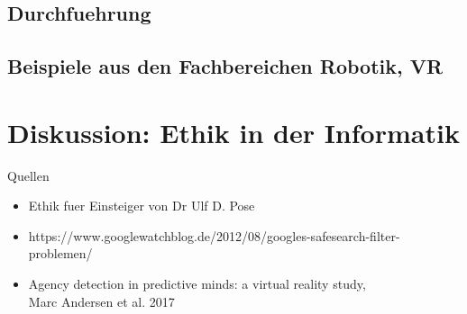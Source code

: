 \documentclass[10pt]{beamer}
\begin{document}
\subsection{Durchfuehrung}

\subsection{Beispiele aus den Fachbereichen Robotik, VR}


\section{Diskussion: Ethik in der Informatik}




\begin{frame}{Quellen}
	\begin{itemize}
		\item Ethik fuer Einsteiger von Dr Ulf D. Pose
		\item https://www.googlewatchblog.de/2012/08/googles-safesearch-filter-problemen/
		\item Agency detection in predictive minds: a virtual reality study, \\ Marc Andersen et al. 2017
	\end{itemize}
	
\end{frame}
\end{document}
